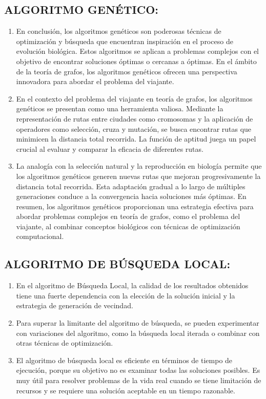 \documentclass{article}
\begin{document}
\subsection{ALGORITMO GENÉTICO:}
\begin{enumerate}
  \item En conclusión, los algoritmos genéticos son poderosas técnicas de optimización y búsqueda que encuentran inspiración en el proceso de evolución biológica. Estos algoritmos se aplican a problemas complejos con el objetivo de encontrar soluciones óptimas o cercanas a óptimas. En el ámbito de la teoría de grafos, los algoritmos genéticos ofrecen una perspectiva innovadora para abordar el problema del viajante.
  \item En el contexto del problema del viajante en teoría de grafos, los algoritmos genéticos se presentan como una herramienta valiosa. Mediante la representación de rutas entre ciudades como cromosomas y la aplicación de operadores como selección, cruza y mutación, se busca encontrar rutas que minimicen la distancia total recorrida. La función de aptitud juega un papel crucial al evaluar y comparar la eficacia de diferentes rutas.
  \item La analogía con la selección natural y la reproducción en biología permite que los algoritmos genéticos generen nuevas rutas que mejoran progresivamente la distancia total recorrida. Esta adaptación gradual a lo largo de múltiples generaciones conduce a la convergencia hacia soluciones más óptimas. En resumen, los algoritmos genéticos proporcionan una estrategia efectiva para abordar problemas complejos en teoría de grafos, como el problema del viajante, al combinar conceptos biológicos con técnicas de optimización computacional.
\end{enumerate}

\subsection{ALGORITMO DE BÚSQUEDA LOCAL:}
\begin{enumerate}
  \item En el algoritmo de Búsqueda Local, la calidad de los resultados obtenidos tiene una fuerte dependencia con la elección de la solución inicial y la estrategia de generación de vecindad.
  \item Para superar la limitante del algoritmo de búsqueda, se pueden experimentar con variaciones del algoritmo, como la búsqueda local iterada o combinar con otras técnicas de optimización.
  \item El algoritmo de búsqueda local es eficiente en términos de tiempo de ejecución, porque su objetivo no es examinar todas las soluciones posibles. Es muy útil para resolver problemas de la vida real cuando se tiene limitación de recursos y se requiere una solución aceptable en un tiempo razonable.
\end{enumerate}
\end{document}
